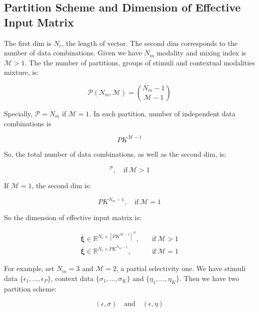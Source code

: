 \documentclass[conference]{acmsiggraph}
\begin{document}
\subsection{Partition Scheme and Dimension of Effective Input Matrix}

The first dim is $N_c$, the length of vector. The second dim corresponds to the number of data combinations. Given we have $N_m$ modality and mixing index is $\mathcal{M} > 1$. The the number of partitions, groups of stimuli and contextual modalities mixture, is:

\begin{equation}
    \mathcal{P}(N_m,\mathcal{M}) = {N_m-1 \choose \mathcal{M}-1}
\end{equation}

Specially, $\mathcal{P} = N_m$ if $\mathcal{M} = 1$. In each partition, number of independent data combinations is

\begin{equation*}
    PK^{\mathcal{M}-1}
\end{equation*}

So, the total number of data combinations, as well as the second dim, is:

\begin{equation}
    [PK^{\mathcal{M}-1}]^{\mathcal{P}}, \quad \text{if} \ \mathcal{M} > 1
\end{equation}

If $\mathcal{M} = 1$, the second dim is:

\begin{equation}
    PK^{N_m-1}, \quad \text{if} \ \mathcal{M} = 1
\end{equation}

So the dimension of effective input matrix is:

\begin{align}
    \bar{\mathbf{\xi}} \in \mathbb{R}^{{N_c} \times [PK^{\mathcal{M}-1}]^{\mathcal{P}}}, &\quad \text{if} \ \mathcal{M} > 1 \\
    \bar{\mathbf{\xi}} \in \mathbb{R}^{{N_c} \times PK^{N_m-1}}, &\quad \text{if} \ \mathcal{M} = 1
\end{align}

For example, set $N_m = 3$ and $\mathcal{M} = 2$, a partial selectivity one. We have stimuli data $\{\epsilon_1,\dots,\epsilon_P\}$, context data $\{\sigma_1,\dots,\sigma_K\}$ and $\{\eta_1,\dots,\eta_K\}$. Then we have two partition scheme:

\begin{equation*}
    (\epsilon,\sigma) \quad \text{and} \quad (\epsilon,\eta)
\end{equation*}
\end{document}
